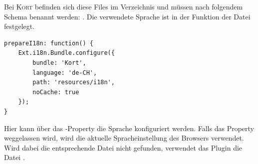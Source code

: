 Bei \textsc{Kort} befinden sich diese Files im Verzeichnis  und müssen nach folgendem Schema benannt werden: .
Die verwendete Sprache ist in der Funktion  der Datei  festgelegt.

\lstset{language=JavaScript}
\begin{lstlisting}[caption=kort - Sprache definieren, label=kort-choose-language]
prepareI18n: function() {
	Ext.i18n.Bundle.configure({
		bundle: 'Kort',
		language: 'de-CH',
		path: 'resources/i18n',
		noCache: true
	});
}
\end{lstlisting}

Hier kann über das -Property die Sprache konfiguriert werden.
Falls das Property weggelassen wird, wird die aktuelle Spracheinstellung des Browsers verwendet.
Wird dabei die entsprechende Datei nicht gefunden, verwendet das Plugin die Datei .